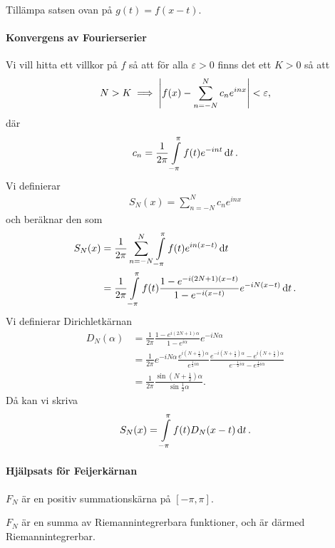 \proof
Tillämpa satsen ovan på $g(t) = f(x - t)$.

\paragraph{Konvergens av Fourierserier}

\proof
Vi vill hitta ett villkor på $f$ så att för alla $\varepsilon > 0$ finns det ett $K > 0$ så att
\begin{align*}
	N > K \implies \abs{f(x) - \sum\limits_{n = -N}^{N}c_{n}e^{inx}} < \varepsilon,
\end{align*}
där
\begin{align*}
	c_{n} = \frac{1}{2\pi}\int\limits_{-\pi}^{\pi}f(t)e^{-int}\dd{t}.
\end{align*}
Vi definierar
\begin{align*}
	S_{N}(x) = \sum\limits_{n = -N}^{N}c_{n}e^{inx}
\end{align*}
och beräknar den som
\begin{align*}
	S_{N}(x) &= \frac{1}{2\pi}\sum\limits_{n = -N}^{N}\int\limits_{-\pi}^{\pi}f(t)e^{in(x - t)}\dd{t} \\
	         &= \frac{1}{2\pi}\int\limits_{-\pi}^{\pi}f(t)\frac{1 - e^{-i(2N + 1)(x - t)}}{1 - e^{-i(x - t)}}e^{-iN(x - t)}\dd{t}.
\end{align*}
Vi definierar Dirichletkärnan
\begin{align*}
	D_{N}(\alpha) &= \frac{1}{2\pi}\frac{1 - e^{i(2N + 1)\alpha}}{1 - e^{i\alpha}}e^{-iN\alpha} \\
	              &= \frac{1}{2\pi}e^{-iN\alpha}\frac{e^{i\left(N + \frac{1}{2}\right)\alpha}}{e^{\frac{1}{2}i\alpha}}\frac{e^{-i\left(N + \frac{1}{2}\right)\alpha} - e^{i\left(N + \frac{1}{2}\right)\alpha}}{e^{-\frac{1}{2}i\alpha} - e^{\frac{1}{2}i\alpha}} \\
	              &= \frac{1}{2\pi}\frac{\sin{\left(N + \frac{1}{2}\right)\alpha}}{\sin{\frac{1}{2}\alpha}}.
\end{align*}
Då kan vi skriva
\begin{align*}
	S_{N}(x) = \int\limits_{-\pi}^{\pi}f(t)D_{N}(x - t)\dd{t}.
\end{align*}

\paragraph{Hjälpsats för Feijerkärnan}
$F_{N}$ är en positiv summationskärna på $[-\pi, \pi]$.

\proof
$F_{N}$ är en summa av Riemannintegrerbara funktioner, och är därmed Riemannintegrerbar.

